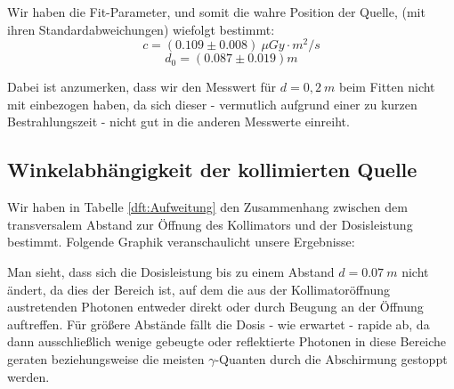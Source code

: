 Wir haben die Fit-Parameter, und somit die wahre Position der Quelle, (mit ihren Standardabweichungen) wiefolgt bestimmt:
\begin{equation*}
		c = (0.109 \pm 0.008)\ \mu Gy \cdot m^2/s
\end{equation*}
\begin{equation*}
		d_0 = (0.087 \pm 0.019) m
\end{equation*}

Dabei ist anzumerken, dass wir den Messwert für $d=0,2\ m$ beim Fitten nicht mit einbezogen haben, da sich dieser - vermutlich aufgrund einer zu kurzen Bestrahlungszeit - nicht gut in die anderen Messwerte einreiht.

\subsection{Winkelabhängigkeit der kollimierten Quelle}
Wir haben in Tabelle \ref{dft:Aufweitung} den Zusammenhang zwischen dem transversalem Abstand zur Öffnung des Kollimators und der Dosisleistung bestimmt. Folgende Graphik veranschaulicht unsere Ergebnisse:

    \minipanf    
        \label{fig:Aufweitung}
    \minipend
    \vspace{5mm}

Man sieht, dass sich die Dosisleistung bis zu einem Abstand $d=0.07\ m$ nicht ändert, da dies der Bereich ist, auf dem die aus der Kollimatoröffnung austretenden Photonen entweder direkt oder durch Beugung an der Öffnung auftreffen. Für größere Abstände fällt die Dosis - wie erwartet - rapide ab, da dann ausschließlich wenige gebeugte oder reflektierte Photonen in diese Bereiche geraten beziehungsweise die meisten $\gamma$-Quanten durch die Abschirmung gestoppt werden.

